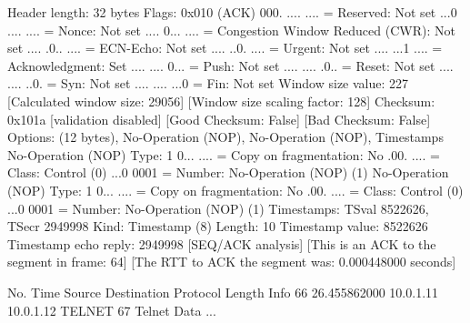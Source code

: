     Header length: 32 bytes
    Flags: 0x010 (ACK)
        000. .... .... = Reserved: Not set
        ...0 .... .... = Nonce: Not set
        .... 0... .... = Congestion Window Reduced (CWR): Not set
        .... .0.. .... = ECN-Echo: Not set
        .... ..0. .... = Urgent: Not set
        .... ...1 .... = Acknowledgment: Set
        .... .... 0... = Push: Not set
        .... .... .0.. = Reset: Not set
        .... .... ..0. = Syn: Not set
        .... .... ...0 = Fin: Not set
    Window size value: 227
    [Calculated window size: 29056]
    [Window size scaling factor: 128]
    Checksum: 0x101a [validation disabled]
        [Good Checksum: False]
        [Bad Checksum: False]
    Options: (12 bytes), No-Operation (NOP), No-Operation (NOP), Timestamps
        No-Operation (NOP)
            Type: 1
                0... .... = Copy on fragmentation: No
                .00. .... = Class: Control (0)
                ...0 0001 = Number: No-Operation (NOP) (1)
        No-Operation (NOP)
            Type: 1
                0... .... = Copy on fragmentation: No
                .00. .... = Class: Control (0)
                ...0 0001 = Number: No-Operation (NOP) (1)
        Timestamps: TSval 8522626, TSecr 2949998
            Kind: Timestamp (8)
            Length: 10
            Timestamp value: 8522626
            Timestamp echo reply: 2949998
    [SEQ/ACK analysis]
        [This is an ACK to the segment in frame: 64]
        [The RTT to ACK the segment was: 0.000448000 seconds]

No.     Time           Source                Destination           Protocol Length Info
     66 26.455862000   10.0.1.11             10.0.1.12             TELNET   67     Telnet Data ...

